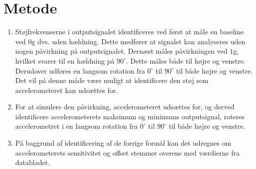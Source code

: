 \section{Metode}
\begin{enumerate} [label=\bfseries Formål \arabic*:]
\item Støjfrekvenserne i outputsignalet identificeres ved først at måle en baseline ved $0$g dvs. uden hældning. Dette medfører at signalet kan analyseres uden nogen påvirkning på outputsignalet. Dernæst måles  påvirkningen ved $1$g, hvilket svarer til en hældning på $90^{\circ}$. Dette måles både til højre og venstre. Derudover udføres en langsom rotation fra $0^{\circ}$ til $90^{\circ}$ til både højre og venstre. Det vil på denne måde være muligt at identificere den støj som accelerometeret kan udsættes for. %
\item For at simulere den påvirkning, accelerometeret udsættes for, og derved identificere accelerometerets maksimum og minimums outputsignal, roteres accelerometret i en langsom rotation fra $0^{\circ}$ til $90^{\circ}$ til både højre og venstre.
\item På baggrund af identificering af de forrige formål  kan det udregnes om accelerometerets sensitivitet og offset stemmer overens med værdierne fra databladet. \cite{Devices2009} 
\end{enumerate}

